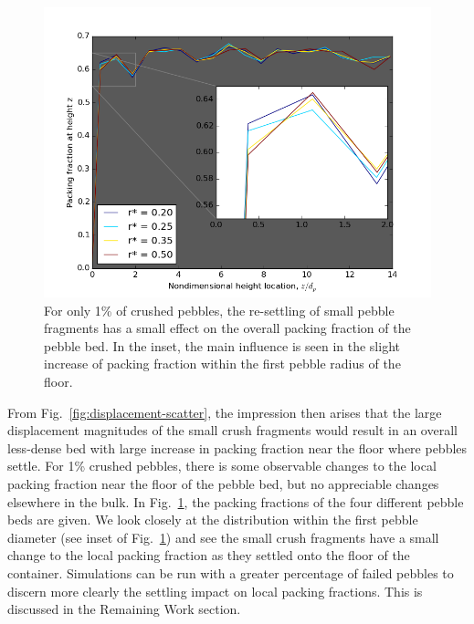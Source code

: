 \begin{figure}[!t]
\centering
    \includegraphics[width=\singleimagewidth]{chapters/figures/crush-fragments/packing-fraction-height.png}
    \caption{For only 1\% of crushed pebbles, the re-settling of small pebble fragments has a small effect on the overall packing fraction of the pebble bed. In the inset, the main influence is seen in the slight increase of packing fraction within the first pebble radius of the floor.}
    \label{fig:fragment-packing-fraction}
\end{figure}

From Fig.~\ref{fig:displacement-scatter}, the impression then arises that the large displacement magnitudes of the small crush fragments would result in an overall less-dense bed with large increase in packing fraction near the floor where pebbles settle. For 1\% crushed pebbles, there is some observable changes to the local packing fraction near the floor of the pebble bed, but no appreciable changes elsewhere in the bulk. In Fig.~\ref{fig:fragment-packing-fraction}, the packing fractions of the four different pebble beds are given. We look closely at the distribution within the first pebble diameter (see inset of Fig.~\ref{fig:fragment-packing-fraction}) and see the small crush fragments have a small change to the local packing fraction as they settled onto the floor of the container. Simulations can be run with a greater percentage of failed pebbles to discern more clearly the settling impact on local packing fractions. This is discussed in the Remaining Work section.


